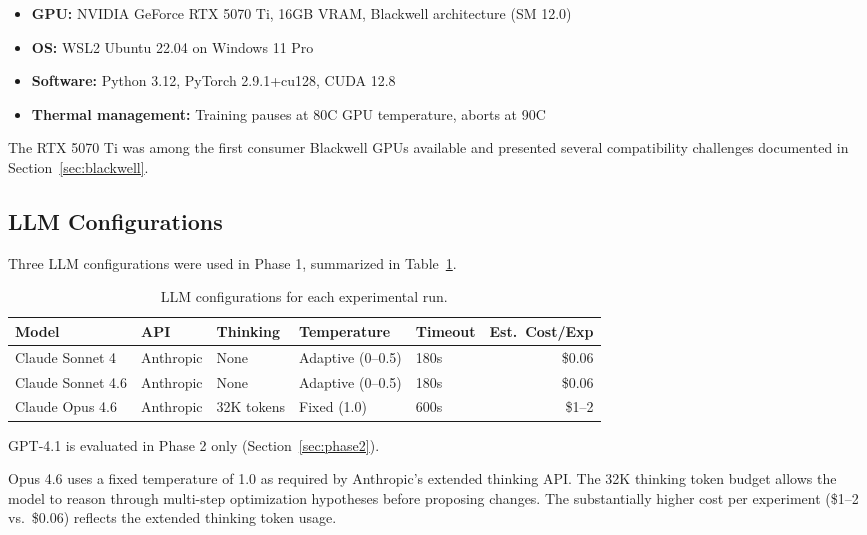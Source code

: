 \documentclass[11pt]{article}
\begin{document}
\begin{itemize}[leftmargin=*]
    \item \textbf{GPU:} NVIDIA GeForce RTX 5070 Ti, 16GB VRAM, Blackwell architecture (SM 12.0)
    \item \textbf{OS:} WSL2 Ubuntu 22.04 on Windows 11 Pro
    \item \textbf{Software:} Python 3.12, PyTorch 2.9.1+cu128, CUDA 12.8
    \item \textbf{Thermal management:} Training pauses at 80\textdegree C GPU temperature, aborts at 90\textdegree C
\end{itemize}

The RTX 5070 Ti was among the first consumer Blackwell GPUs available and presented several compatibility challenges documented in Section~\ref{sec:blackwell}.

\subsection{LLM Configurations}
\label{sec:llm_configs}

Three LLM configurations were used in Phase 1, summarized in Table~\ref{tab:llm_configs}.

\begin{table}[H]
\centering
\caption{LLM configurations for each experimental run.}
\label{tab:llm_configs}
\begin{tabular}{lllllr}
\toprule
\textbf{Model} & \textbf{API} & \textbf{Thinking} & \textbf{Temperature} & \textbf{Timeout} & \textbf{Est.\ Cost/Exp} \\
\midrule
Claude Sonnet 4     & Anthropic     & None       & Adaptive (0--0.5)  & 180s  & \$0.06 \\
Claude Sonnet 4.6   & Anthropic     & None       & Adaptive (0--0.5)  & 180s  & \$0.06 \\
Claude Opus 4.6     & Anthropic     & 32K tokens & Fixed (1.0)        & 600s  & \$1--2 \\
\bottomrule
\end{tabular}
\end{table}

GPT-4.1 is evaluated in Phase 2 only (Section~\ref{sec:phase2}).

Opus 4.6 uses a fixed temperature of 1.0 as required by Anthropic's extended thinking API. The 32K thinking token budget allows the model to reason through multi-step optimization hypotheses before proposing changes. The substantially higher cost per experiment (\$1--2 vs.\ \$0.06) reflects the extended thinking token usage.
\end{document}
